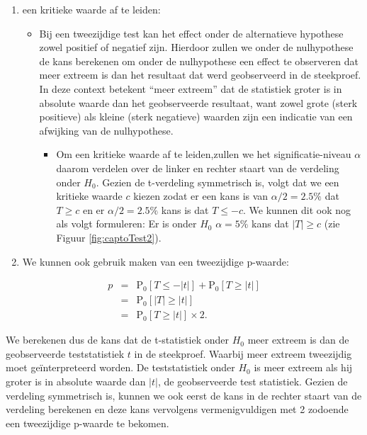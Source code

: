 \documentclass[
  12pt,dutch,coursenotes]{book}
\providecommand{\tightlist}{%
  \setlength{\itemsep}{0pt}\setlength{\parskip}{0pt}}
\theoremstyle{definition}
\theoremstyle{definition}
\theoremstyle{definition}
\theoremstyle{remark}
\begin{document}
\begin{enumerate}
\def\labelenumi{\arabic{enumi}.}
\tightlist
\item
  een kritieke waarde af te leiden:

  \begin{itemize}
  \tightlist
  \item
    Bij een tweezijdige test kan het effect onder de alternatieve hypothese zowel positief of negatief zijn. Hierdoor zullen we onder de nulhypothese de kans berekenen om onder de nulhypothese een effect te observeren dat meer extreem is dan het resultaat dat werd geobserveerd in de steekproef. In deze context betekent ``meer extreem'' dat de statistiek groter is in absolute waarde dan het geobserveerde resultaat, want zowel grote (sterk positieve) als kleine (sterk negatieve) waarden zijn een indicatie van een afwijking van de nulhypothese.

    \begin{itemize}
    \tightlist
    \item
      Om een kritieke waarde af te leiden,zullen we het significatie-niveau \(\alpha\) daarom verdelen over de linker en rechter staart van de verdeling onder \(H_0\). Gezien de t-verdeling symmetrisch is, volgt dat we een kritieke waarde \(c\) kiezen zodat er een kans is van \(\alpha/2=2.5\%\) dat \(T\geq c\) en er \(\alpha/2=2.5\%\) kans is dat \(T\leq -c\). We kunnen dit ook nog als volgt formuleren: Er is onder \(H_0\) \(\alpha=5\%\) kans dat \(\vert T\vert\geq c\) (zie Figuur \ref{fig:captoTest2}).
    \end{itemize}
  \end{itemize}
\item
  We kunnen ook gebruik maken van een tweezijdige p-waarde:
\end{enumerate}

\begin{eqnarray*}
  p&=&\text{P}_0\left[T\leq -|t|\right] + \text{P}_0\left[T\geq |t|\right]\\
  &=&\text{P}_0\left[\vert T\vert \geq \vert t \vert\right]\\
  &=&\text{P}_0\left[T \geq \vert t \vert\right]\times 2.
\end{eqnarray*}

We berekenen dus de kans dat de t-statistiek onder \(H_0\) meer extreem is dan de geobserveerde teststatistiek \(t\) in de steekproef.
Waarbij meer extreem tweezijdig moet geïnterpreteerd worden.
De teststatistiek onder \(H_0\) is meer extreem als hij groter is in absolute waarde dan \(\vert t \vert\), de geobserveerde test statistiek.
Gezien de verdeling symmetrisch is, kunnen we ook eerst de kans in de rechter staart van de verdeling berekenen en deze kans vervolgens vermenigvuldigen met 2 zodoende een tweezijdige p-waarde te bekomen.
\end{document}
